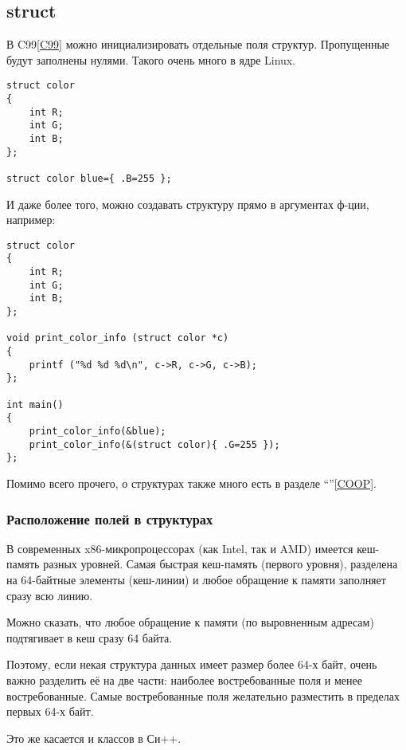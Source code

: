 ﻿\subsection{struct}

В C99\ref{C99} можно инициализировать отдельные поля структур. Пропущенные будут заполнены нулями. Такого очень
много в ядре Linux. 

\begin{lstlisting}
struct color
{
	int R;
	int G;
	int B;
};

struct color blue={ .B=255 };
\end{lstlisting}

И даже более того, можно создавать структуру прямо в аргументах ф-ции, например:

\begin{lstlisting}
struct color
{
	int R;
	int G;
	int B;
};

void print_color_info (struct color *c)
{
	printf ("%d %d %d\n", c->R, c->G, c->B);
};

int main()
{
	print_color_info(&blue);
	print_color_info(&(struct color){ .G=255 });
};
\end{lstlisting}

Помимо всего прочего, о структурах также много есть в разделе ``\COOPname''\ref{COOP}.

\subsubsection{Расположение полей в структурах}

В современных x86-микропроцессорах (как Intel, так и AMD) имеется кеш-память разных уровней. 
Самая быстрая кеш-память (первого уровня),
разделена на 64-байтные элементы (кеш-линии) и любое обращение к памяти заполняет сразу всю линию\cite{AgnerFog}.

Можно сказать, что любое обращение к памяти (по выровненным адресам) подтягивает в кеш сразу 64 байта.

Поэтому, если некая структура данных имеет размер более 64-х байт, очень важно разделить её на две части:
наиболее востребованные поля и менее востребованные. 
Самые востребованные поля желательно разместить в пределах первых 64-х байт.

Это же касается и классов в Си++.

